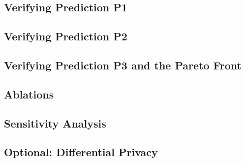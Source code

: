 \documentclass{article}
\begin{document}
\subsection{Verifying Prediction P1}

\subsection{Verifying Prediction P2}

\subsection{Verifying Prediction P3 and the Pareto Front}

\subsection{Ablations}

\subsection{Sensitivity Analysis}

\subsection{Optional: Differential Privacy}
\label{sec:dp}

\end{document}
